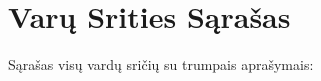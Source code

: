 \section{Varų Srities Sąrašas}
Sąrašas visų vardų sričių su trumpais aprašymais\+:\begin{DoxyCompactList}
\item{}
\end{DoxyCompactList}
